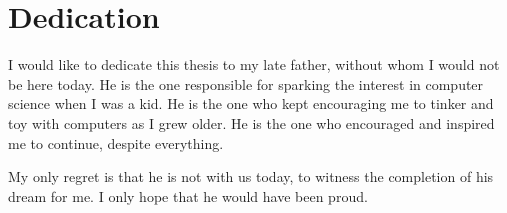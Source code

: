 \chapter{Dedication}
	I would like to dedicate this thesis to my late father, without whom I would not be here today. He is the one responsible for sparking the interest in computer science when I was a kid. He is the one who kept encouraging me to tinker and toy with computers as I grew older. He is the one who encouraged and inspired me to continue, despite everything.

	My only regret is that he is not with us today, to witness the completion of his dream for me. I only hope that he would have been proud.